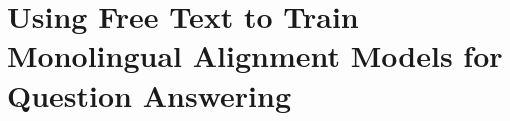 %

\chapter{Using Free Text to Train Monolingual Alignment Models for Question Answering \label{chapter:naacl2015}}
%
%



%
%


%

%
%
%
%

